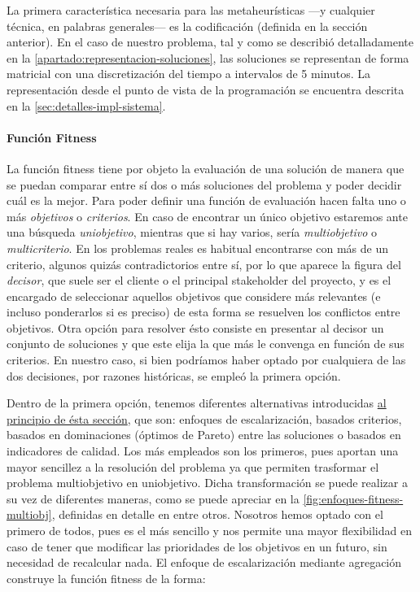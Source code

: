 La primera característica necesaria para las metaheurísticas ---y cualquier técnica, en palabras generales--- es la codificación (definida en la sección anterior). En el caso de nuestro problema, tal y como se describió detalladamente en la \autoref{apartado:representacion-soluciones}, las soluciones se representan de forma matricial con una discretización del tiempo a intervalos de 5 minutos. La representación desde el punto de vista de la programación se encuentra descrita en la \autoref{sec:detalles-impl-sistema}. %


\paragraph{Función Fitness} \label{apartado:adaptacion-fitness}

La función fitness tiene por objeto la evaluación de una solución de manera que se puedan comparar entre sí dos o más soluciones del problema y poder decidir cuál es la mejor.  Para poder definir una función de evaluación hacen falta uno o más \textit{objetivos} o \textit{criterios}. En caso de encontrar un único objetivo estaremos ante una búsqueda \textit{uniobjetivo}, mientras que si hay varios, sería \textit{multiobjetivo} o \textit{multicriterio}. En los problemas reales es habitual encontrarse con más de un criterio, algunos quizás contradictorios entre sí, por lo que aparece la figura del \textit{decisor}, que suele ser el cliente o el principal stakeholder del proyecto, y es el encargado de seleccionar aquellos objetivos que considere más relevantes (e incluso ponderarlos si es preciso) de esta forma se resuelven los conflictos entre objetivos. Otra opción para resolver ésto consiste en presentar al decisor un conjunto de soluciones y que este elija la que más le convenga en función de sus criterios. En nuestro caso, si bien podríamos haber optado por cualquiera de las dos decisiones, por razones históricas, se empleó la primera opción. 

Dentro de la primera opción, tenemos diferentes alternativas introducidas \hyperref[sec:3:metaheurística]{al principio de ésta sección}, que son: enfoques de escalarización, basados criterios, basados en dominaciones (óptimos de Pareto) entre las soluciones o basados en indicadores de calidad. Los más empleados son los primeros, pues aportan una mayor sencillez a la resolución del problema ya que permiten trasformar el problema multiobjetivo en uniobjetivo. Dicha transformación se puede realizar a su vez de diferentes maneras, como se puede apreciar en la \autoref{fig:enfoques-fitness-multiobj}, definidas en detalle en \cite{sota:metaheuristicas-design-impl} entre otros. Nosotros hemos optado con el primero de todos, pues es el más sencillo y nos permite una mayor flexibilidad en caso de tener que modificar las prioridades de los objetivos en un futuro, sin necesidad de recalcular nada. El enfoque de escalarización mediante agregación construye la función fitness de la forma:

